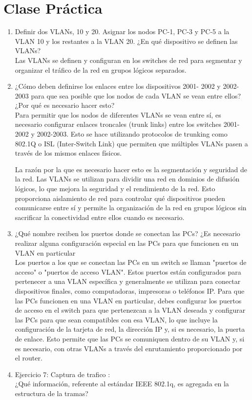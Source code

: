 \documentclass[a4paper]{article}
\begin{document}
\hfill

\section*{Clase Práctica}
\begin{enumerate}
	\item	 Definir dos VLANs, 10 y 20. Asignar los nodos PC-1, PC-3 y PC-5
	a la VLAN 10 y los restantes a la VLAN 20. ¿En qué dispositivo se
	definen las VLANs? 
	\\
Las VLANs se definen y configuran en los switches de red para segmentar y organizar el tráfico de la red en grupos lógicos separados.
	\item¿Cómo deben definirse los enlaces entre los dispositivos 2001-
	2002 y 2002-2003 para que sea posible que los nodos de cada
	VLAN se vean entre ellos? ¿Por qué es necesario hacer esto?
\\
Para permitir que los nodos de diferentes VLANs se vean entre sí, es necesario configurar enlaces troncales (trunk links) entre los switches 2001-2002 y 2002-2003. Esto se hace utilizando protocolos de trunking como 802.1Q o ISL (Inter-Switch Link) que permiten que múltiples VLANs pasen a través de los mismos enlaces físicos. 

La razón por la que es necesario hacer esto es la segmentación y seguridad de la red. Las VLANs se utilizan para dividir una red en dominios de difusión lógicos, lo que mejora la seguridad y el rendimiento de la red. Esto proporciona aislamiento de red para controlar qué dispositivos pueden comunicarse entre sí y permite la organización de la red en grupos lógicos sin sacrificar la conectividad entre ellos cuando es necesario.
\item ¿Qué nombre reciben los puertos donde se conectan las PCs?
	¿Es necesario realizar alguna configuración especial en las
	PCs para que funcionen en un VLAN en particular
\\
Los puertos a los que se conectan las PCs en un switch se llaman "puertos de acceso" o "puertos de acceso VLAN". Estos puertos están configurados para pertenecer a una VLAN específica y generalmente se utilizan para conectar dispositivos finales, como computadoras, impresoras o teléfonos IP.
Para que las PCs funcionen en una VLAN en particular, debes configurar los puertos de acceso en el switch para que pertenezcan a la VLAN deseada y configurar las PCs para que sean compatibles con esa VLAN, lo que incluye la configuración de la tarjeta de red, la dirección IP y, si es necesario, la puerta de enlace. Esto permite que las PCs se comuniquen dentro de su VLAN y, si es necesario, con otras VLANs a través del enrutamiento proporcionado por el router.
\item Ejercicio 7: Captura de trafico : \\¿Qué información, referente al estándar IEEE 802.1q, es
agregada en la estructura de la tramas?



\end{enumerate}
\end{document}
